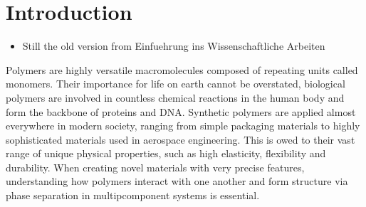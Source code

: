 \documentclass[bachelor,       %
               twoside,        %
               BCOR10mm,       %
               ngerman, english %
               ]{GAUBM}
\begin{document}
\mainmatter   %


\chapter{Introduction}
\begin{itemize}
    \item Still the old version from Einfuehrung ins Wissenschaftliche Arbeiten
\end{itemize}
Polymers are highly versatile macromolecules composed of repeating units called monomers. Their importance for life on earth cannot be overstated, biological polymers are involved in countless chemical reactions in the human body and form the backbone of proteins and DNA. Synthetic polymers are applied almost everywhere in modern society, ranging from simple packaging materials to highly sophisticated materials used in aerospace engineering. This is owed to their vast range of unique physical properties, such as high elasticity, flexibility and durability. When creating novel materials with very precise features, understanding how polymers interact with one another and form structure via phase separation in multipcomponent systems is essential.\\
\end{document}
